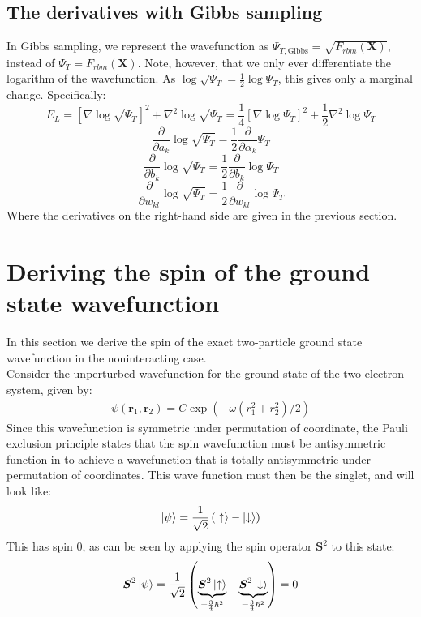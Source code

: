 \documentclass[a4paper, 10pt]{article}
\begin{document}
\begin{appendices}
	\subsection{The derivatives with Gibbs sampling}\label{ap:derivative_gibbs}
	In Gibbs sampling, we represent the wavefunction as $\Psi_{T, \mathrm{Gibbs}}=\sqrt{F_{rbm}(\boldsymbol{X})}$, instead of $\Psi_T=F_{rbm}(\boldsymbol{X})$. Note, however, that we only ever differentiate the logarithm of the wavefunction. As $\log \sqrt{\Psi_T}=\frac{1}{2}\log \Psi_T$, this gives only a marginal change. Specifically:
	\begin{equation}
	E_L=[\nabla \log \sqrt{\Psi_T}]^2 + \nabla^2 \log \sqrt{\Psi_T} =\frac{1}{4}[\nabla \log \Psi_T]^2 +\frac{1}{2}\nabla^2 \log \Psi_T
	\end{equation}
	\begin{equation}
	\frac{\partial }{\partial a_k}\log \sqrt{\Psi_T}=\frac{1}{2}\frac{\partial }{\partial \alpha_k}\Psi_T
	\end{equation}
	\begin{equation}
	\frac{\partial }{\partial b_k}\log \sqrt{\Psi_T}=\frac{1}{2}\frac{\partial }{\partial b_k}\log \Psi_T
	\end{equation}
	\begin{equation}
	\frac{\partial}{\partial w_{kl}}\log \sqrt{\Psi_T}=\frac{1}{2}\frac{\partial}{\partial w_{kl}}\log \Psi_T
	\end{equation}
	Where the derivatives on the right-hand side are given in the previous section.
\section{Deriving the spin of the ground state wavefunction}\label{ap:Derivative_spin}
In this section we derive the spin of the exact two-particle ground state wavefunction in the noninteracting case.\\
\linebreak
Consider the unperturbed wavefunction for the ground state of the
two electron system, given by:
\begin{align}
\psi(\boldsymbol{r}_{1},\boldsymbol{r}_{2}) =
C\exp\left(-\omega\left(r_{1}^{2} + r_{2}^{2}\right)/2\right)
\end{align}
Since this wavefunction is symmetric under permutation of coordinate, the
Pauli exclusion principle states that the spin wavefunction must be antisymmetric function in to achieve a wavefunction that is totally antisymmetric under permutation of coordinates. This wave function must then be the singlet, and will look like:
\begin{align}
\ket{\psi} = \frac{1}{\sqrt{2}}\left(\ket{\uparrow} - \ket{\downarrow}\right)
\end{align}
This has spin $0$, as can be seen by applying the spin operator $\boldsymbol{S}^{2}$ to this state:
\begin{align}
\boldsymbol{S}^{2}\ket{\psi} = \frac{1}{\sqrt{2}}\left(
\underbrace{\boldsymbol{S}^{2}\ket{\uparrow}}_{= \frac{3}{4}\hbar^{2}} -
\underbrace{\boldsymbol{S}^{2}\ket{\downarrow}}_{= \frac{3}{4}\hbar^{2}}\right)
= 0
\end{align}
	\end{appendices}
\end{document}
